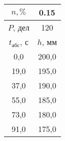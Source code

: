 \begin{tabular}[t]{|c|c|}
\hline
$n, \%$ & 0.15 \\
\hline
$P$, дел & 120 \\
\hline
$t_{абс}$, с & $h$, мм \\ 
\hline
0,0 & 200,0 \\ 
19,0 & 195,0 \\ 
37,0 & 190,0 \\ 
55,0 & 185,0 \\ 
73,0 & 180,0 \\ 
91,0 & 175,0 \\ 
\hline
\end{tabular}
